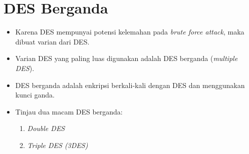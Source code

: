 \documentclass{article}
\begin{document}

\section*{DES Berganda}

\begin{itemize}
    \item Karena DES mempunyai potensi kelemahan pada \textit{brute force attack}, maka dibuat varian dari DES.
    \item Varian DES yang paling luas digunakan adalah DES berganda (\textit{multiple DES}).
    \item DES berganda adalah enkripsi berkali-kali dengan DES dan menggunakan kunci ganda.
    \item Tinjau dua macam DES berganda:
    \begin{enumerate}
        \item \textit{Double DES}
        \item \textit{Triple DES (3DES)}
    \end{enumerate}
\end{itemize}
\end{document}
